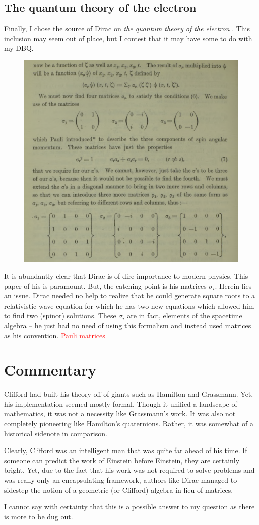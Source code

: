 \documentclass[12pt]{article}
\begin{document}
\newpage
\subsection{The quantum theory of the electron}

Finally, I chose the source of Dirac on \emph{the quantum theory of the electron} \cite{dirac_quantum_1928}. This inclusion may seem out of place, but I contest that it may have some to do with my DBQ.

\begin{figure}[H]
    \centering
    \includegraphics[width=.6\textwidth]{figures/dirac_matrices.png}
\end{figure}

It is abundantly clear that Dirac is of dire importance to modern physics. This paper of his is paramount. But, the catching point is his matrices $\sigma_i$. Herein lies an issue. Dirac needed no help to realize that he could generate square roots to a relativistic wave equation for which he has two new equations which allowed him to find two (spinor) solutions. These $\sigma_i$ are in fact, elements of the spacetime algebra -- he just had no need of using this formalism and instead used matrices as his convention. 
\textcolor{red}{Pauli matrices}


\newpage
\section{Commentary}

Clifford had built his theory off of giants such as Hamilton and Grassmann. Yet, his implementation seemed mostly formal. Though it unified a landscape of mathematics, it was not a necessity like Grassmann's work. It was also not completely pioneering like Hamilton's quaternions. Rather, it was somewhat of a historical sidenote in comparison.

Clearly, Clifford was an intelligent man that was quite far ahead of his time. If someone can predict the work of Einstein before Einstein, they are certainly bright. Yet, due to the fact that his work was not required to solve problems and was really only an encapsulating framework, authors like Dirac managed to sidestep the notion of a geometric (or Clifford) algebra in lieu of matrices. 

I cannot say with certainty that this is a possible answer to my question as there is more to be dug out. 





\end{document}
